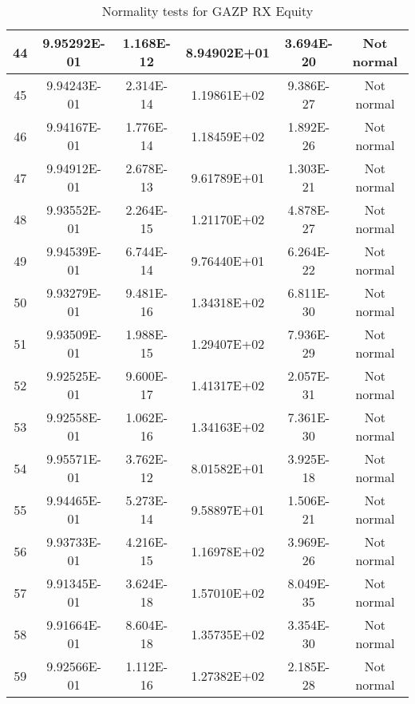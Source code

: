 \begin{table}[h]
\begin{tabular}{|c|c|c|c|c|c|}
		44 & 9.95292E-01 & 1.168E-12 & 8.94902E+01 & 3.694E-20 & Not normal\\\hline
		45 & 9.94243E-01 & 2.314E-14 & 1.19861E+02 & 9.386E-27 & Not normal\\\hline
		46 & 9.94167E-01 & 1.776E-14 & 1.18459E+02 & 1.892E-26 & Not normal\\\hline
		47 & 9.94912E-01 & 2.678E-13 & 9.61789E+01 & 1.303E-21 & Not normal\\\hline
		48 & 9.93552E-01 & 2.264E-15 & 1.21170E+02 & 4.878E-27 & Not normal\\\hline
		49 & 9.94539E-01 & 6.744E-14 & 9.76440E+01 & 6.264E-22 & Not normal\\\hline
		50 & 9.93279E-01 & 9.481E-16 & 1.34318E+02 & 6.811E-30 & Not normal\\\hline
		51 & 9.93509E-01 & 1.988E-15 & 1.29407E+02 & 7.936E-29 & Not normal\\\hline
		52 & 9.92525E-01 & 9.600E-17 & 1.41317E+02 & 2.057E-31 & Not normal\\\hline
		53 & 9.92558E-01 & 1.062E-16 & 1.34163E+02 & 7.361E-30 & Not normal\\\hline
		54 & 9.95571E-01 & 3.762E-12 & 8.01582E+01 & 3.925E-18 & Not normal\\\hline
		55 & 9.94465E-01 & 5.273E-14 & 9.58897E+01 & 1.506E-21 & Not normal\\\hline
		56 & 9.93733E-01 & 4.216E-15 & 1.16978E+02 & 3.969E-26 & Not normal\\\hline
		57 & 9.91345E-01 & 3.624E-18 & 1.57010E+02 & 8.049E-35 & Not normal\\\hline
		58 & 9.91664E-01 & 8.604E-18 & 1.35735E+02 & 3.354E-30 & Not normal\\\hline
		59 & 9.92566E-01 & 1.112E-16 & 1.27382E+02 & 2.185E-28 & Not normal\\\hline
	\end{tabular}
	\caption{Normality tests for GAZP RX Equity}
	\label{tab:normality_tests_GAZP_RX}
\end{table}
